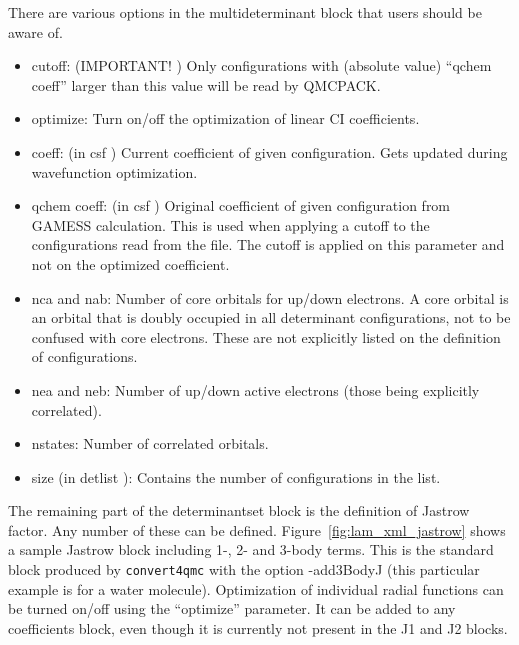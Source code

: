 There are various options in the multideterminant block that users should be aware of.
\begin{itemize}
  \item{cutoff: (IMPORTANT! ) Only configurations with (absolute value) “qchem coeff”
larger than this value will be read by QMCPACK.}
  \item{optimize: Turn on/off the optimization of linear CI coefficients.}
  \item{coeff: (in csf ) Current coefficient of given configuration. Gets updated during 
wavefunction optimization.}
  \item{qchem coeff: (in csf ) Original coefficient of given configuration from GAMESS 
calculation. This is used when applying a cutoff to the configurations read from the file.
The cutoff is applied on this parameter and not on the optimized coefficient.}
  \item{nca and nab: Number of core orbitals for up/down electrons. A core orbital is an
orbital that is doubly occupied in all determinant configurations, not to be confused
with core electrons. These are not explicitly listed on the definition of configurations.}
  \item{nea and neb: Number of up/down active electrons (those being explicitly correlated).}
  \item{nstates: Number of correlated orbitals}.
  \item{size (in detlist ): Contains the number of configurations in the list.}
\end{itemize}
The remaining part of the determinantset block is the definition of Jastrow factor. Any
number of these can be defined. Figure~\ref{fig:lam_xml_jastrow} shows a sample Jastrow 
block including 1-, 2- and 3-body terms. This is the standard block produced by 
\texttt{convert4qmc} with the option -add3BodyJ (this particular example is for a water molecule). 
Optimization of individual radial functions can be turned on/off using the “optimize” 
parameter. It can be added to any coefficients block, even though it is currently not 
present in the J1 and J2 blocks.

